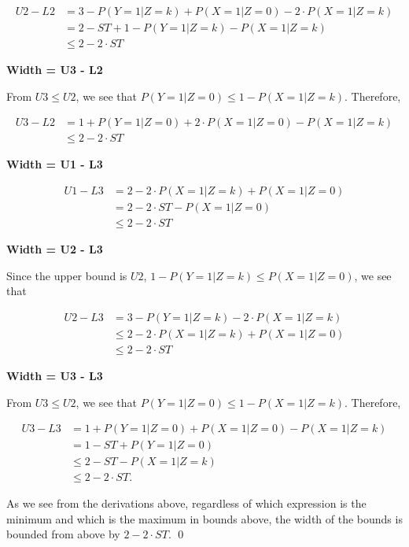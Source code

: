 \documentclass[
]{article}
\theoremstyle{plain}
\begin{document}
\[\begin{aligned}
U2 - L2 &= 3 - P(Y = 1 | Z = k) + P(X = 1 | Z = 0) - 2\cdot P(X = 1 | Z = k) \\
        &= 2 - ST + 1 - P(Y = 1 | Z = k) - P(X = 1 | Z = k) \\
        &\le 2 - 2\cdot ST
\end{aligned}\]

\textbf{Width = U3 - L2}

From \(U3 \le U2\), we see that \(P(Y = 1 | Z = 0) \le 1 - P(X = 1 | Z = k)\). Therefore,

\[\begin{aligned}
U3 - L2 &= 1 + P(Y = 1 | Z = 0) + 2\cdot P(X = 1 | Z = 0) - P(X = 1 | Z = k) \\
        &\le 2 - 2\cdot ST
\end{aligned}\]

\textbf{Width = U1 - L3}

\[\begin{aligned}
U1 - L3 &= 2 - 2\cdot P(X = 1 | Z = k) + P(X = 1 | Z = 0) \\
        &= 2 - 2\cdot ST - P(X = 1 | Z = 0) \\
        &\le 2 - 2\cdot ST
\end{aligned}\]

\textbf{Width = U2 - L3}

Since the upper bound is \(U2\), \(1 - P(Y = 1 | Z = k) \le P(X = 1 | Z = 0)\), we see that

\[\begin{aligned}
U2 - L3 &= 3 - P(Y = 1 | Z = k) - 2\cdot P(X = 1 | Z = k) \\
        &\le 2 - 2\cdot P(X = 1 | Z = k) + P(X = 1 | Z = 0) \\
        &\le 2 - 2\cdot ST
\end{aligned}\]

\textbf{Width = U3 - L3}

From \(U3 \le U2\), we see that \(P(Y = 1 | Z = 0) \le 1 - P(X = 1 | Z = k)\). Therefore,

\[\begin{aligned}
U3 - L3 &= 1 + P(Y = 1 | Z = 0) + P(X = 1 | Z = 0) - P(X = 1 | Z = k)\\
        &= 1 - ST + P(Y = 1 | Z = 0) \\
        &\le 2 - ST - P(X = 1 | Z = k) \\
        &\le 2 - 2\cdot ST.
\end{aligned}\]

As we see from the derivations above, regardless of which expression is the minimum and which is the maximum in bounds above, the width of the bounds is bounded from above by \(2 - 2\cdot ST\). \qed
\end{document}
